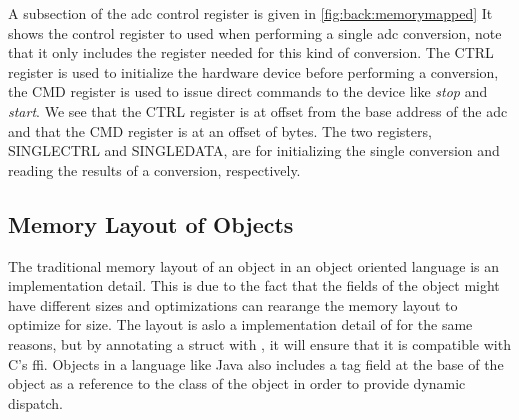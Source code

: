A subsection of the \gls{adc} control register is given in \autoref{fig:back:memorymapped}
It shows the control register to used when performing a single \gls{adc} conversion, note that it only includes the register needed for this kind of conversion.
The CTRL register is used to initialize the hardware device before performing a conversion, the CMD register is used to issue direct commands to the device like \emph{stop} and \emph{start}.
We see that the CTRL register is at offset  from the base address of the \gls{adc} and that the CMD register is at an offset of  bytes.
The two registers, SINGLECTRL and SINGLEDATA, are for initializing the single conversion and reading the results of a conversion, respectively.

\subsection{Memory Layout of Objects}

The traditional memory layout of an object in an object oriented language is an implementation detail.
This is due to the fact that the fields of the object might have different sizes and optimizations can rearange the memory layout to optimize for size.
The layout is aslo a implementation detail of {\rust} for the same reasons, but by annotating a struct with \attrib{\#[repr(C)]}, it will ensure that it is compatible with C's \gls{ffi}.
Objects in a language like Java also includes a tag field at the base of the object as a reference to the class of the object in order to provide dynamic dispatch.


